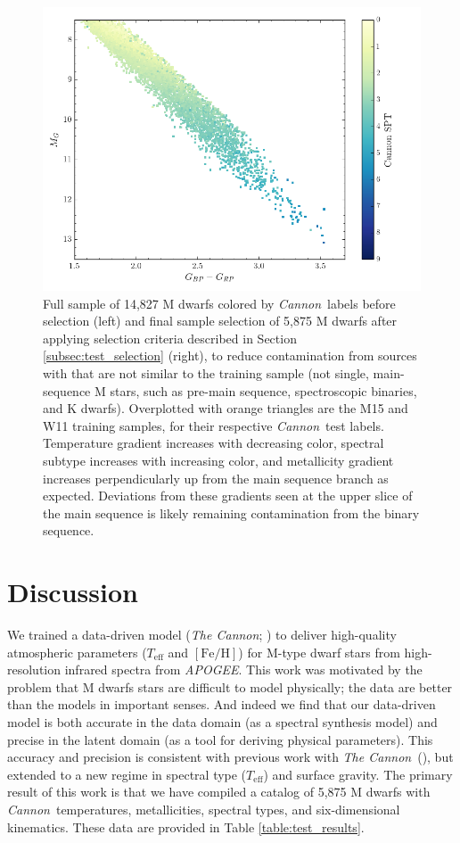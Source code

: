 \documentclass[twocolumn]{aastex62}
\newcommand{\apogee}{\textsl{APOGEE}}
\newcommand{\thecannon}{\textsl{The Cannon}}
\newcommand{\cannon}{\textsl{Cannon}}
\newcommand{\teff}{T_{\mathrm{eff}}}
\newcommand{\feh}{[{\mathrm{Fe}/\mathrm{H}}]}
\begin{document}
\begin{figure}
\begin{center}
	\includegraphics[width=.48\linewidth]{figures/cmd_spt_safe.png}
	\caption{Full sample of 14,827 M dwarfs colored by \cannon\ labels before selection (left) and final sample selection of 5,875 M dwarfs after applying selection criteria described in Section \ref{subsec:test_selection} (right), to reduce contamination from sources with that are not similar to the training sample (not single, main-sequence M stars, such as pre-main sequence, spectroscopic binaries, and K dwarfs). Overplotted with orange triangles are the M15 and W11 training samples, for their respective \cannon\ test labels. Temperature gradient increases with decreasing color, spectral subtype increases with increasing color, and metallicity gradient increases perpendicularly up from the main sequence branch as expected. Deviations from these gradients seen at the upper slice of the main sequence is likely remaining contamination from the binary sequence.}
	\label{fig:safe_selection}
\end{center}
\end{figure}

\section{Discussion} \label{sec:discussion}

We trained a data-driven model (\thecannon; \citealt{Ness:2015}) to deliver
high-quality atmospheric parameters ($\teff$ and $\feh$) for M-type dwarf stars
from high-resolution infrared spectra from \apogee.
This work was motivated by the problem that M dwarfs stars are difficult to
model physically; the data are better than the models in important senses.
And indeed we find that our data-driven model is both accurate in the
data domain (as a spectral synthesis model) and precise in the latent domain
(as a tool for deriving physical parameters).
This accuracy and precision is consistent with previous work with
\thecannon\ (\citealt{Ness:2015, Casey:2016, Ho:2017a, Ness:2018}), but
extended to a new regime in spectral type ($\teff$) and surface
gravity.
The primary result of this work is that
we have compiled a catalog of 5,875 M dwarfs with \cannon\ temperatures,
metallicities, spectral types, and six-dimensional kinematics.
These data are provided in Table \ref{table:test_results}.
\end{document}
